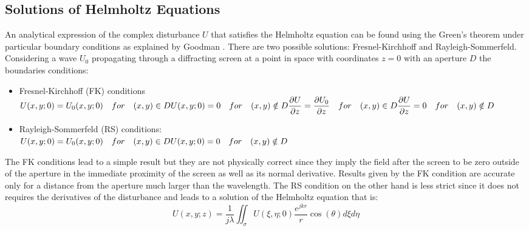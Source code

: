 \subsection{Solutions of Helmholtz Equations}
 An analytical expression of the complex disturbance $U$ that satisfies the Helmholtz equation can be found using the Green's theorem under particular boundary conditions as explained by Goodman \cite{goodman2005introduction}. There are two possible solutions: Fresnel-Kirchhoff and Rayleigh-Sommerfeld.
Considering a wave $U_0$ propagating through a diffracting screen at a point in space with coordinates $z=0$ with an aperture $D$ the boundaries conditions:
\begin{itemize}
	\item Fresnel-Kirchhoff (FK) conditions \\
	\begin{math}
		\label{eq:FKbound}
		U(x,y;0)=U_0(x,y;0) \quad for \quad (x,y)\in D\\
		U(x,y;0)=0 \quad for \quad (x,y)\notin D\\
		\\
		\dfrac{\partial U}{\partial z}=\dfrac{\partial U_0}{\partial z} \quad for \quad (x,y)\in D\\
		\\
		\dfrac{\partial U}{\partial z}=0 \quad for \quad (x,y)\notin D\\	
		\end{math}
	\item Rayleigh-Sommerfeld (RS) conditions:\\
	\begin{math}
	U(x,y;0)=U_0(x,y;0) \quad for \quad (x,y)\in D\\
	U(x,y;0)=0 \quad for \quad (x,y)\notin D\\
	\end{math}
\end{itemize}
	The FK conditions lead to a simple result but they are not physically correct since they imply the field after the screen to be zero outside of the aperture in the immediate proximity of the screen as well as its normal derivative. Results given by the FK condition are accurate only for a distance from the aperture much larger than the wavelength.
	The RS condition on the other hand is less strict since it does not requires the derivatives of the disturbance and leads to a solution of the Helmholtz equation that is:
	\begin{equation}
	\label{eq:RSintegral}
	U(x,y;z)=\dfrac{1}{j\lambda}\iint_{\sigma}^{}U(\xi,\eta;0)\dfrac{e^{jkr}}{r} \cos(\theta) d\xi d\eta
		\end{equation}
